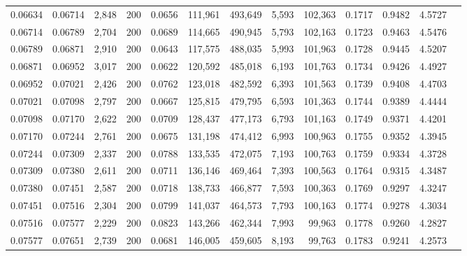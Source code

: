 \begin{tabular}{rrrrrrrrrrrrr}
0.06634 & 0.06714 & 2,848 & 200 &                                     0.0656 & 111,961 & 493,649 &   5,593 & 102,363 & 0.1717 & 0.9482 & 4.5727 \\
0.06714 & 0.06789 & 2,704 & 200 &                                     0.0689 & 114,665 & 490,945 &   5,793 & 102,163 & 0.1723 & 0.9463 & 4.5476 \\
0.06789 & 0.06871 & 2,910 & 200 &                                     0.0643 & 117,575 & 488,035 &   5,993 & 101,963 & 0.1728 & 0.9445 & 4.5207 \\
0.06871 & 0.06952 & 3,017 & 200 &                                     0.0622 & 120,592 & 485,018 &   6,193 & 101,763 & 0.1734 & 0.9426 & 4.4927 \\
0.06952 & 0.07021 & 2,426 & 200 &                                     0.0762 & 123,018 & 482,592 &   6,393 & 101,563 & 0.1739 & 0.9408 & 4.4703 \\
0.07021 & 0.07098 & 2,797 & 200 &                                     0.0667 & 125,815 & 479,795 &   6,593 & 101,363 & 0.1744 & 0.9389 & 4.4444 \\
0.07098 & 0.07170 & 2,622 & 200 &                                     0.0709 & 128,437 & 477,173 &   6,793 & 101,163 & 0.1749 & 0.9371 & 4.4201 \\
0.07170 & 0.07244 & 2,761 & 200 &                                     0.0675 & 131,198 & 474,412 &   6,993 & 100,963 & 0.1755 & 0.9352 & 4.3945 \\
0.07244 & 0.07309 & 2,337 & 200 &                                     0.0788 & 133,535 & 472,075 &   7,193 & 100,763 & 0.1759 & 0.9334 & 4.3728 \\
0.07309 & 0.07380 & 2,611 & 200 &                                     0.0711 & 136,146 & 469,464 &   7,393 & 100,563 & 0.1764 & 0.9315 & 4.3487 \\
0.07380 & 0.07451 & 2,587 & 200 &                                     0.0718 & 138,733 & 466,877 &   7,593 & 100,363 & 0.1769 & 0.9297 & 4.3247 \\
0.07451 & 0.07516 & 2,304 & 200 &                                     0.0799 & 141,037 & 464,573 &   7,793 & 100,163 & 0.1774 & 0.9278 & 4.3034 \\
0.07516 & 0.07577 & 2,229 & 200 &                                     0.0823 & 143,266 & 462,344 &   7,993 &  99,963 & 0.1778 & 0.9260 & 4.2827 \\
0.07577 & 0.07651 & 2,739 & 200 &                                     0.0681 & 146,005 & 459,605 &   8,193 &  99,763 & 0.1783 & 0.9241 & 4.2573 \\

\end{tabular}
